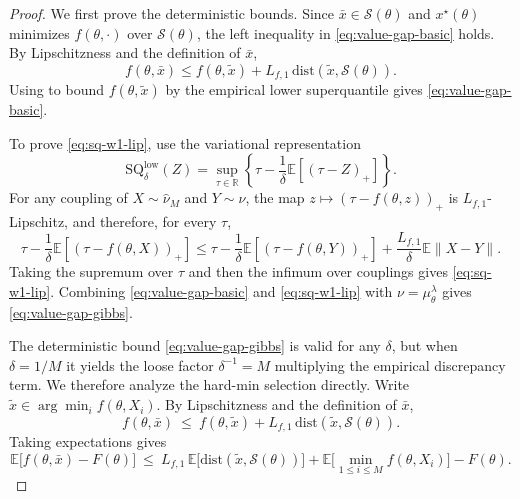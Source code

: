\documentclass{article}
\theoremstyle{normaltheorem}
\newcommand{\gibbs}{\mu}
\newcommand{\R}{\mathbb{R}}
\newcommand{\calS}{\mathcal{S}}
\begin{document}
\begin{proof}
	We first prove the deterministic bounds. Since \(\bar x\in\calS(\theta)\) and \(x^\star(\theta)\) minimizes
	\(f(\theta,\cdot)\) over \(\calS(\theta)\), the left inequality in \eqref{eq:value-gap-basic} holds. By Lipschitzness and
	the definition of \(\bar x\),
	\[
	f(\theta,\bar x)
	\le
	f(\theta,\tilde x)+L_{f,1}\,\mathrm{dist}(\tilde x,\calS(\theta)).
	\]
	Using  to bound \(f(\theta,\tilde x)\) by the empirical lower superquantile gives
	\eqref{eq:value-gap-basic}.
	
	To prove \eqref{eq:sq-w1-lip}, use the variational representation
	\[
	\mathrm{SQ}^{\mathrm{low}}_\delta(Z)
	=
	\sup_{\tau\in\R}\left\{\tau-\frac1\delta\mathbb E[(\tau-Z)_+]\right\}.
	\]
	For any coupling of \(X\sim\widehat\nu_M\) and \(Y\sim\nu\), the map \(z\mapsto(\tau-f(\theta,z))_+\) is
	\(L_{f,1}\)-Lipschitz, and therefore, for every \(\tau\),
	\[
	\tau-\frac1\delta\mathbb E[(\tau-f(\theta,X))_+]
	\le
	\tau-\frac1\delta\mathbb E[(\tau-f(\theta,Y))_+]
	+\frac{L_{f,1}}{\delta}\mathbb E\|X-Y\|.
	\]
	Taking the supremum over \(\tau\) and then the infimum over couplings gives \eqref{eq:sq-w1-lip}. Combining
	\eqref{eq:value-gap-basic} and \eqref{eq:sq-w1-lip} with \(\nu=\gibbs_\theta^\lambda\) gives
	\eqref{eq:value-gap-gibbs}.

		The deterministic bound \eqref{eq:value-gap-gibbs} is valid for any $\delta$, but when $\delta=1/M$ it yields the loose factor
		$\delta^{-1}=M$ multiplying the empirical discrepancy term. We therefore analyze the hard-min selection directly.
		Write $\tilde x\in\arg\min_i f(\theta,X_i)$.
		By Lipschitzness and the definition of $\bar x$,
	\[
	f(\theta,\bar x)\ \le\ f(\theta,\tilde x)+L_{f,1}\,\mathrm{dist}(\tilde x,\calS(\theta)).
	\]
	Taking expectations gives
	\begin{equation}\label{eq:inner-gap-split}
	\mathbb E\big[f(\theta,\bar x)-F(\theta)\big]
	\ \le\
	L_{f,1}\,\mathbb E\big[\mathrm{dist}(\tilde x,\calS(\theta))\big]
	+\mathbb E\Big[\min_{1\le i\le M} f(\theta,X_i)\Big]-F(\theta).
	\end{equation}
	

\end{proof}
\end{document}
